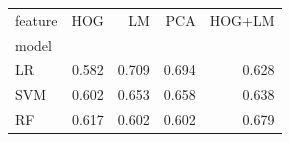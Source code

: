 \begin{tabular}{lrrrr}
\toprule
feature & HOG & LM & PCA & HOG+LM \\
model &  &  &  &  \\
\midrule
LR & 0.582 & 0.709 & 0.694 & 0.628 \\
SVM & 0.602 & 0.653 & 0.658 & 0.638 \\
RF & 0.617 & 0.602 & 0.602 & 0.679 \\
\bottomrule
\end{tabular}
